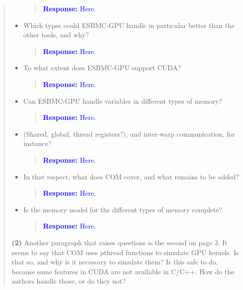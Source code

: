 \documentclass[11pt]{article}
\begin{document}
\begin{quote}
\begin{itemize}
  \begin{quote}
  \textcolor{blue}{\textbf{Response:} Here.}
  \end{quote}
  
  \item Which types could ESBMC-GPU handle in particular better than the other tools, and why?
  
  \begin{quote}
  \textcolor{blue}{\textbf{Response:} Here.}
  \end{quote}
  
  \item To what extent does ESBMC-GPU support CUDA?
  
  \begin{quote}
  \textcolor{blue}{\textbf{Response:} Here.}
  \end{quote}
  
  \item Can ESBMC-GPU handle variables in different types of memory?
  
  \begin{quote}
  \textcolor{blue}{\textbf{Response:} Here.}
  \end{quote}
  
  \item (Shared, global, thread registers?), and inter-warp communication, for instance?
  
  \begin{quote}
  \textcolor{blue}{\textbf{Response:} Here.}
  \end{quote}
  
  \item In that respect, what does COM cover, and what remains to be added?
  
  \begin{quote}
  \textcolor{blue}{\textbf{Response:} Here.}
  \end{quote}
  
  \item Is the memory model for the different types of memory complete?
  
  \begin{quote}
  \textcolor{blue}{\textbf{Response:} Here.}
  \end{quote}
  
  \end{itemize}

{\bf (2)} Another paragraph that raises questions is the second on page 3. It seems to say that COM uses pthread functions to simulate GPU kernels. Is that so, and why is it necessary to simulate them? Is this safe to do, because some features in CUDA are not available in C/C++. How do the authors handle those, or do they not?


\end{quote}
\end{document}
